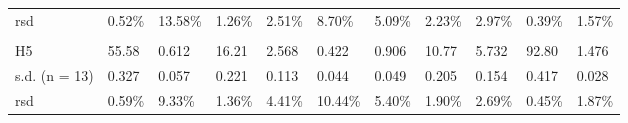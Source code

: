 \documentclass[review,authoryear,12pt]{elsarticle}
\begin{document}
\begin{table}[htpb]
\begin{adjustbox}{max width=\textwidth}
\begin{tabular}{lllllllllll}
rsd           & 0.52\% & 13.58\% & 1.26\% & 2.51\% & 8.70\%  & 5.09\% & 2.23\% & 2.97\% & 0.39\% & 1.57\% \\
              &        &         &        &        &         &        &        &        &        &        \\
H5            & 55.58  & 0.612   & 16.21  & 2.568  & 0.422   & 0.906  & 10.77  & 5.732  & 92.80  & 1.476  \\
s.d. (n = 13) & 0.327  & 0.057   & 0.221  & 0.113  & 0.044   & 0.049  & 0.205  & 0.154  & 0.417  & 0.028  \\
rsd           & 0.59\% & 9.33\%  & 1.36\% & 4.41\% & 10.44\% & 5.40\% & 1.90\% & 2.69\% & 0.45\% & 1.87\%  \\ \midrule

\end{tabular}
\end{adjustbox}
\end{table}

\end{document}
